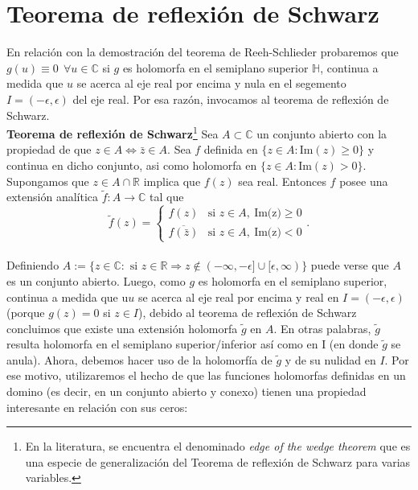 \chapter{Teorema de reflexi\'on de Schwarz}\label{app:schwarz}



En relación con la demostración del teorema de Reeh-Schlieder probaremos que $g(u)\equiv 0\:\:\forall u\in \mathbb{C}$ si $g$ es holomorfa en el semiplano superior $\mathbb{H}$, continua a medida que $u$ se acerca al eje real por encima y nula en el segemento $I=(-\epsilon,\epsilon)$ del eje real. Por esa razón, invocamos al teorema de reflexión de Schwarz.\\

\textbf{Teorema de reflexión de Schwarz}\footnote{En la literatura, se encuentra el denominado \textit{edge of the wedge theorem} que es una especie de generalización del Teorema de reflexión de Schwarz para varias variables.} Sea $A\subset \mathbb{C}$ un conjunto abierto con la propiedad de que $z\in A\Leftrightarrow\bar{z}\in A$. Sea $f$ definida en $\{z\in A:\text{Im}(z)\geq 0\}$ y continua en dicho conjunto, asi como holomorfa en $\{z\in A:\text{Im}(z)>0\}$. Supongamos que $z\in A\cap \mathbb{R}$ implica que $f(z)$ sea real. Entonces $f$ posee una extensión analítica $\tilde{f}:A\rightarrow\mathbb{C}$ tal que
$$\tilde{f}(z)=\begin{cases}f(z)& \text{si } z\in A,\:\text{Im(z)}\geq 0 \\ \overline{f(\bar{z})}& \text{si } z\in A,\:\text{Im(z)}< 0\end{cases}.$$  
\\
 
Definiendo $A:=\{z\in \mathbb{C}: \text{ si }z\in \mathbb{R}\Rightarrow z\not \in(-\infty,-\epsilon]\cup[\epsilon,\infty)\}$ puede verse que $A$ es un conjunto abierto. Luego, como $g$ es holomorfa en el semiplano superior, continua a medida que u$u$ se acerca al eje real por encima y real en $I=(-\epsilon,\epsilon)$ (porque $g(z)=0$ si $z\in I$), debido al teorema de reflexión de Schwarz concluimos que existe una extensión holomorfa $\tilde{g}$ en $A$. En otras palabras, $\tilde{g}$ resulta holomorfa en el semiplano superior/inferior así como en I (en donde $\tilde{g}$ se anula). Ahora, debemos hacer uso de la holomorfía de $\tilde{g}$ y de su nulidad en $I$. Por ese motivo, utilizaremos el hecho de que las funciones holomorfas definidas en un domino (es decir, en un conjunto abierto y conexo) tienen una propiedad interesante en relación con sus ceros:\\

